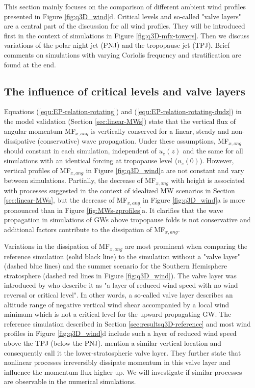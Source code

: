 %
This section mainly focuses on the comparison of different ambient wind profiles presented in Figure \ref{fig:q3D_wind}d. Critical levels and so-called "valve layers" are a central part of the discussion for all wind profiles. They will be introduced first in the context of simulations in Figure \ref{fig:q3D-mfx-towers}. Then we discuss variations of the polar night jet (PNJ) and the tropopause jet (TPJ). Brief comments on simulations with varying Coriolis frequency and stratification are found at the end.

\subsection*{The influence of critical levels and valve layers}
Equations (\ref{equ:EP-relation-rotating}) and (\ref{equ:EP-relation-rotating-dudz}) in the model validation (Section \ref{sec:linear-MWs}) state that the vertical flux of angular momentum MF$_{x,ang}$ is vertically conserved for a linear, steady and non-dissipative (conservative) wave propagation. Under these assumptions, MF$_{x,ang}$ should constant in each simulation, independent of $u_e(z)$ and the same for all simulations with an identical forcing at tropopause level ($u_e(0)$). However, vertical profiles of MF$_{x,ang}$ in Figure \ref{fig:q3D_wind}a are not constant and vary between simulations. Partially, the decrease of MF$_{x,ang}$ with height is associated with processes suggested in the context of idealized MW scenarios in Section \ref{sec:linear-MWs}, but the decrease of MF$_{x,ang}$ in Figure \ref{fig:q3D_wind}a is more pronounced than in Figure \ref{fig:MWs-zprofiles}a. It clarifies that the wave propagation in simulations of GWs above tropopause folds is not conservative and additional factors contribute to the dissipation of MF$_{x,ang}$.

Variations in the dissipation of MF$_{x,ang}$ are most prominent when comparing the reference simulation (solid black line) to the simulation without a "valve layer" (dashed blue lines) and the summer scenario for the Southern Hemisphere stratosphere (dashed red lines in Figure \ref{fig:q3D_wind}). The valve layer was introduced by \textcite[]{kruse_midlatitude_2016} who describe it as "a layer of reduced wind speed with no wind reversal or critical level". In other words, a so-called valve layer describes an altitude range of negative vertical wind shear accompanied by a local wind minimum which is not a critical level for the upward propagating GW. The reference simulation described in Section \ref{sec:resultsq3D-reference} and most wind profiles in Figure \ref{fig:q3D_wind}d include such a layer of reduced wind speed above the TPJ (below the PNJ).  \textcite[]{kruse_midlatitude_2016} mention a similar vertical location and consequently call it the lower-stratospheric valve layer. They further state that nonlinear processes irreversibly dissipate momentum in this valve layer and influence the momentum flux higher up. We will investigate if similar processes are observable in the numerical simulations.


